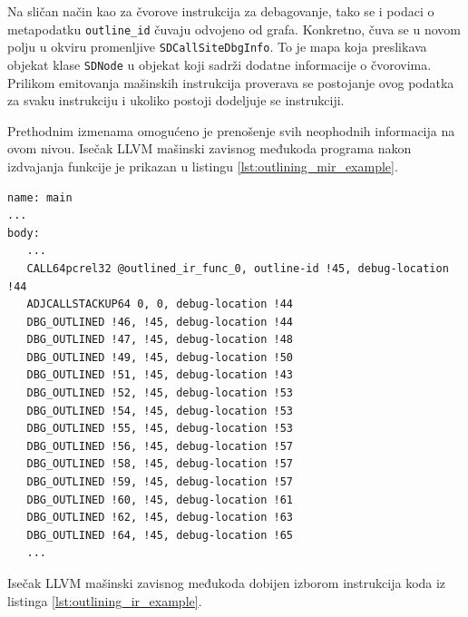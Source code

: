 \documentclass[12pt,oneside]{memoir}
\begin{document}
Na sličan način kao za čvorove instrukcija za debagovanje, tako se i podaci o metapodatku \verb|outline_id| čuvaju odvojeno od grafa.
Konkretno, čuva se u novom polju u okviru promenljive \verb|SDCallSiteDbgInfo|. %
To je mapa koja preslikava objekat klase \verb|SDNode| u objekat koji sadrži dodatne informacije o čvorovima.
Prilikom emitovanja mašinskih instrukcija proverava se postojanje ovog podatka za svaku instrukciju i ukoliko postoji dodeljuje se instrukciji.


Prethodnim izmenama omogućeno je prenošenje svih neophodnih informacija na ovom nivou.
Isečak LLVM mašinski zavisnog međukoda programa nakon izdvajanja funkcije je prikazan u listingu \ref{lst:outlining_mir_example}.

\begin{listing}[!ht]
\begin{verbatim}
name: main
...
body:
   ...
   CALL64pcrel32 @outlined_ir_func_0, outline-id !45, debug-location !44
   ADJCALLSTACKUP64 0, 0, debug-location !44
   DBG_OUTLINED !46, !45, debug-location !44
   DBG_OUTLINED !47, !45, debug-location !48
   DBG_OUTLINED !49, !45, debug-location !50
   DBG_OUTLINED !51, !45, debug-location !43
   DBG_OUTLINED !52, !45, debug-location !53
   DBG_OUTLINED !54, !45, debug-location !53
   DBG_OUTLINED !55, !45, debug-location !53
   DBG_OUTLINED !56, !45, debug-location !57
   DBG_OUTLINED !58, !45, debug-location !57
   DBG_OUTLINED !59, !45, debug-location !57
   DBG_OUTLINED !60, !45, debug-location !61
   DBG_OUTLINED !62, !45, debug-location !63
   DBG_OUTLINED !64, !45, debug-location !65
   ...
\end{verbatim}
\caption{Isečak LLVM mašinski zavisnog međukoda dobijen izborom instrukcija koda iz listinga \ref{lst:outlining_ir_example}.}
\label{lst:outlining_mir_example}
\end{listing}
\end{document}
